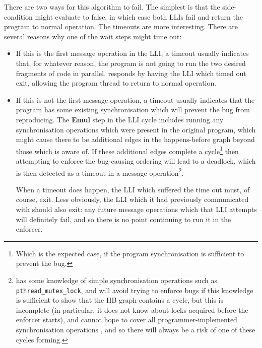 There are two ways for this algorithm to fail.  The simplest is that
the side-condition might evaluate to false, in which case both LLIs
fail and return the program to normal operation.  The timeouts are
more interesting.  There are several reasons why one of the wait steps
might time out:

\begin{itemize}
\item
  If this is the first message operation in the LLI, a timeout usually
  indicates that, for whatever reason, the program is not going to run
  the two desired fragments of code in parallel.  {\Technique}
  responds by having the LLI which timed out exit, allowing the
  program thread to return to normal operation.

\item
  If this is not the first message operation, a timeout usually
  indicates that the program has some existing synchronisation which
  will prevent the bug from reproducing.  The \textbf{Emul} step in
  the LLI cycle includes running any synchronisation operations which
  were present in the original program, which might cause there to be
  additional edges in the happens-before graph beyond those which
  {\technique} is aware of.  If these additional edges complete a
  cycle\footnote{Which is the expected case, if the program
    synchronisation is sufficient to prevent the bug.} then attempting
  to enforce the bug-causing ordering will lead to a deadlock, which
  is then detected as a timeout in a message
  operation\footnote{{\Technique} has some knowledge of simple
    synchronisation operations such as \texttt{pthread\_mutex\_lock},
    and will avoid trying to enforce bugs if this knowledge is
    sufficient to show that the HB graph contains a cycle, but this is
    incomplete (in particular, it does not know about locks acquired
    before the enforcer starts), and cannot hope to cover all
    programmer-implemented synchronisation operations , and so there will always be a risk of one of these
    cycles forming.}.

  When a timeout does happen, the LLI which suffered the time out
  must, of course, exit.  Less obviously, the LLI which it had
  previously communicated with should also exit: any future message
  operations which that LLI attempts will definitely fail, and so
  there is no point continuing to run it in the enforcer.
\end{itemize}


